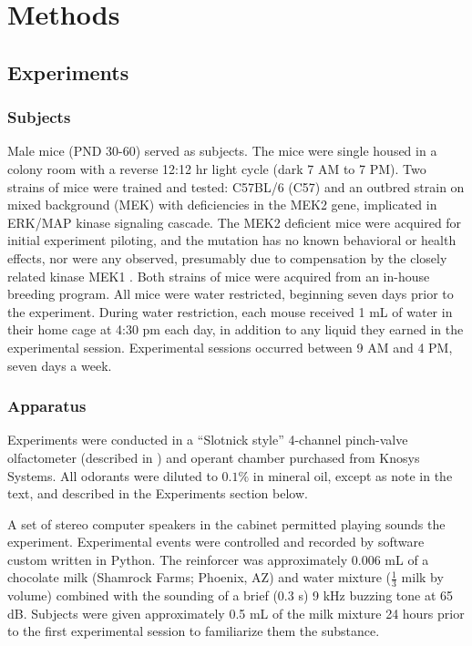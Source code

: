 \section*{Methods}
\label{sec:methods}
\subsection*{Experiments}

\subsubsection*{Subjects}
\label{sec:methods_subjects}
Male mice (PND 30-60) served as subjects. The mice were single housed in a colony room with a reverse 12:12 hr light cycle (dark 7 AM to 7 PM). Two strains of mice were trained and tested: C57BL/6 (C57) and an outbred strain on mixed background (MEK) with deficiencies in the MEK2 gene, implicated in ERK/MAP kinase signaling cascade. The MEK2 deficient mice were acquired for initial experiment piloting, and the mutation has no known behavioral or health effects, nor were any observed, presumably due to compensation by the closely related kinase MEK1 \cite{12832465}. Both strains of mice were acquired from an in-house breeding program. All mice were water restricted, beginning seven days prior to the experiment. During water restriction, each mouse received 1 mL of water in their home cage at 4:30 pm each day, in addition to any liquid they earned in the experimental session. Experimental sessions occurred between 9 AM and 4 PM, seven days a week.

\subsubsection*{Apparatus}
\label{sec:methods_apparatus}
Experiments were conducted in a ``Slotnick style'' 4-channel pinch-valve olfactometer (described in \cite{18428626}) and operant chamber purchased from Knosys Systems. All odorants were diluted to $0.1\%$ in mineral oil, except as note in the text, and described in the Experiments section below.

A set of stereo computer speakers in the cabinet permitted playing sounds the experiment.  Experimental events were controlled and recorded by software custom written in Python. The reinforcer was approximately 0.006 mL of a chocolate milk (Shamrock Farms; Phoenix, AZ) and water mixture ($\frac{1}{3}$ milk by volume) combined with the sounding of a brief (0.3 s) 9 kHz buzzing tone at 65 dB. Subjects were given approximately 0.5 mL of the milk mixture 24 hours prior to the first experimental session to familiarize them the substance.  

